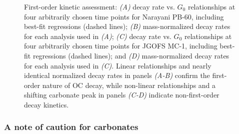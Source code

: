\begin{figure}[p]
	\caption[Assessment of first-order kinetics]{First-order kinetic assessment: \textit{(A)} decay rate vs. $G_{0}$ relationships at four arbitrarily chosen time points for Narayani PB-60, including best-fit regressions (dashed lines); \textit{(B)} mass-normalized decay rates for each analysis used in \textit{(A)}; \textit{(C)} decay rate vs. $G_{0}$ relationships at four arbitrarily chosen time points for JGOFS MC-1, including best-fit regressions (dashed lines); and \textit{(D)} mass-normalized decay rates for each analysis used in \textit{(C)}. Linear relationships and nearly identical normalized decay rates in panels \textit{(A-B)} confirm the first-order nature of OC decay, while non-linear relationships and a shifting carbonate peak in panels \textit{(C-D)} indicate non-first-order  decay kinetics.}
	\label{Ch3Fig:4} 
\end{figure}

\subsubsection{A note of caution for carbonates}\label{Ch3Sec:3521}

